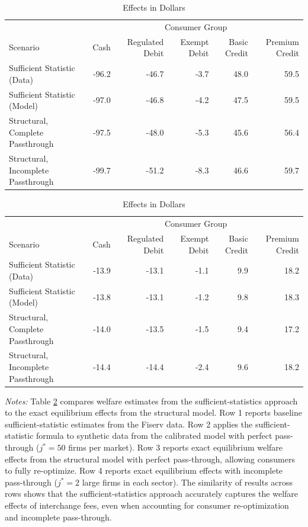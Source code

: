 \documentclass[11pt,english]{article}
\theoremstyle{remark}
\begin{document}
\clearpage

\begin{table}[H]
\caption{Comparison of Sufficient Statistic and Structural Approaches\label{tab:compare-ss-model}}


\caption{Effects in Basis Points}

\begin{tabular}[t]{lrrrrr}
\toprule
\multicolumn{1}{c}{ } & \multicolumn{5}{c}{Consumer Group} \\
Scenario & Cash & Regulated Debit & Exempt Debit & Basic Credit & Premium Credit\\
\midrule
Sufficient Statistic (Data) & -96.2 & -46.7 & -3.7 & 48.0 & 59.5\\
Sufficient Statistic (Model) & -97.0 & -46.8 & -4.2 & 47.5 & 59.5\\
Structural, Complete Passthrough & -97.5 & -48.0 & -5.3 & 45.6 & 56.4\\
Structural, Incomplete Passthrough & -99.7 & -51.2 & -8.3 & 46.6 & 59.7\\
\bottomrule
\end{tabular}
 

\vspace{0.5cm}


\caption{Effects in Dollars}

\begin{tabular}[t]{lrrrrr}
\toprule
\multicolumn{1}{c}{ } & \multicolumn{5}{c}{Consumer Group} \\
Scenario & Cash & Regulated Debit & Exempt Debit & Basic Credit & Premium Credit\\
\midrule
Sufficient Statistic (Data) & -13.9 & -13.1 & -1.1 & 9.9 & 18.2\\
Sufficient Statistic (Model) & -13.8 & -13.1 & -1.2 & 9.8 & 18.3\\
Structural, Complete Passthrough & -14.0 & -13.5 & -1.5 & 9.4 & 17.2\\
Structural, Incomplete Passthrough & -14.4 & -14.4 & -2.4 & 9.6 & 18.2\\
\bottomrule
\end{tabular}
 

\par\textit{Notes:} Table \ref{tab:compare-ss-model} compares welfare estimates from the sufficient-statistics approach to the exact equilibrium effects from the structural model. Row 1 reports baseline sufficient-statistic estimates from the Fiserv data. Row 2 applies the sufficient-statistic formula to synthetic data from the calibrated model with perfect pass-through ($j^*=50$ firms per market). Row 3 reports exact equilibrium welfare effects from the structural model with perfect pass-through, allowing consumers to fully re-optimize. Row 4 reports exact equilibrium effects with incomplete pass-through ($j^*=2$ large firms in each sector). 
The similarity of results across rows shows that the sufficient-statistics approach accurately captures the welfare effects of interchange fees, even when accounting for consumer re-optimization and incomplete pass-through.

\end{table}
\end{document}
